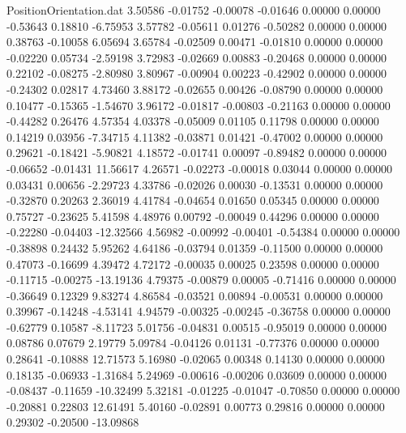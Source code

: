\begin{filecontents}{PositionOrientation.dat}
   3.50586   -0.01752   -0.00078    -0.01646    0.00000    0.00000   -0.53643    0.18810   -6.75953
   3.57782   -0.05611    0.01276    -0.50282    0.00000    0.00000    0.38763   -0.10058    6.05694
   3.65784   -0.02509    0.00471    -0.01810    0.00000    0.00000   -0.02220    0.05734   -2.59198
   3.72983   -0.02669    0.00883    -0.20468    0.00000    0.00000    0.22102   -0.08275   -2.80980
   3.80967   -0.00904    0.00223    -0.42902    0.00000    0.00000   -0.24302    0.02817    4.73460
   3.88172   -0.02655    0.00426    -0.08790    0.00000    0.00000    0.10477   -0.15365   -1.54670
   3.96172   -0.01817   -0.00803    -0.21163    0.00000    0.00000   -0.44282    0.26476    4.57354
   4.03378   -0.05009    0.01105     0.11798    0.00000    0.00000    0.14219    0.03956   -7.34715
   4.11382   -0.03871    0.01421    -0.47002    0.00000    0.00000    0.29621   -0.18421   -5.90821
   4.18572   -0.01741    0.00097    -0.89482    0.00000    0.00000   -0.06652   -0.01431   11.56617
   4.26571   -0.02273   -0.00018     0.03044    0.00000    0.00000    0.03431    0.00656   -2.29723
   4.33786   -0.02026    0.00030    -0.13531    0.00000    0.00000   -0.32870    0.20263    2.36019
   4.41784   -0.04654    0.01650     0.05345    0.00000    0.00000    0.75727   -0.23625    5.41598
   4.48976    0.00792   -0.00049     0.44296    0.00000    0.00000   -0.22280   -0.04403  -12.32566
   4.56982   -0.00992   -0.00401    -0.54384    0.00000    0.00000   -0.38898    0.24432    5.95262
   4.64186   -0.03794    0.01359    -0.11500    0.00000    0.00000    0.47073   -0.16699    4.39472
   4.72172   -0.00035    0.00025     0.23598    0.00000    0.00000   -0.11715   -0.00275  -13.19136
   4.79375   -0.00879    0.00005    -0.71416    0.00000    0.00000   -0.36649    0.12329    9.83274
   4.86584   -0.03521    0.00894    -0.00531    0.00000    0.00000    0.39967   -0.14248   -4.53141
   4.94579   -0.00325   -0.00245    -0.36758    0.00000    0.00000   -0.62779    0.10587   -8.11723
   5.01756   -0.04831    0.00515    -0.95019    0.00000    0.00000    0.08786    0.07679    2.19779
   5.09784   -0.04126    0.01131    -0.77376    0.00000    0.00000    0.28641   -0.10888   12.71573
   5.16980   -0.02065    0.00348     0.14130    0.00000    0.00000    0.18135   -0.06933   -1.31684
   5.24969   -0.00616   -0.00206     0.03609    0.00000    0.00000   -0.08437   -0.11659  -10.32499
   5.32181   -0.01225   -0.01047    -0.70850    0.00000    0.00000   -0.20881    0.22803   12.61491
   5.40160   -0.02891    0.00773     0.29816    0.00000    0.00000    0.29302   -0.20500  -13.09868

\end{filecontents}
